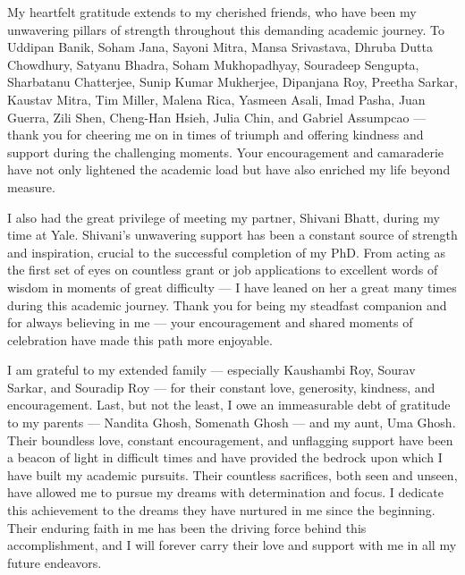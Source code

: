 \documentclass[letterpaper,10pt]{yalephd}
\begin{document}
My heartfelt gratitude extends to my cherished friends, who have been my unwavering pillars of strength throughout this demanding academic journey. To  Uddipan Banik, Soham Jana, Sayoni Mitra, Mansa Srivastava, Dhruba Dutta Chowdhury, Satyanu Bhadra, Soham Mukhopadhyay, Souradeep Sengupta, Sharbatanu Chatterjee, Sunip Kumar Mukherjee, Dipanjana Roy, Preetha Sarkar, Kaustav Mitra, Tim Miller, Malena Rica, Yasmeen Asali, Imad Pasha, Juan Guerra, Zili Shen, Cheng-Han Hsieh, Julia Chin, and Gabriel Assumpcao --- thank you for cheering me on in times of triumph and offering kindness and support during the challenging moments. Your encouragement and camaraderie have not only lightened the academic load but have also enriched my life beyond measure.

I also had the great privilege of meeting my partner, Shivani Bhatt, during my time at Yale. Shivani's unwavering support has been a constant source of strength and inspiration,  crucial to the successful completion of my PhD. From acting as the first set of eyes on countless grant or job applications to excellent words of wisdom in moments of great difficulty --- I have leaned on her a great many times during this academic journey. Thank you for being my steadfast companion and for always believing in me --- your encouragement and shared moments of celebration have made this path more enjoyable.

I am grateful to my extended family --- especially Kaushambi Roy, Sourav Sarkar, and Souradip Roy --- for their constant love, generosity, kindness, and encouragement.  Last, but not the least, I owe an immeasurable debt of gratitude to my parents --- Nandita Ghosh, Somenath Ghosh --- and my aunt, Uma Ghosh. Their boundless love, constant encouragement, and unflagging support have been a beacon of light in difficult times and have provided the bedrock upon which I have built my academic pursuits. Their countless sacrifices, both seen and unseen, have allowed me to pursue my dreams with determination and focus. I dedicate this achievement to the dreams they have nurtured in me since the beginning. Their enduring faith in me has been the driving force behind this accomplishment, and I will forever carry their love and support with me in all my future endeavors.



\mainmatter
\end{document}
